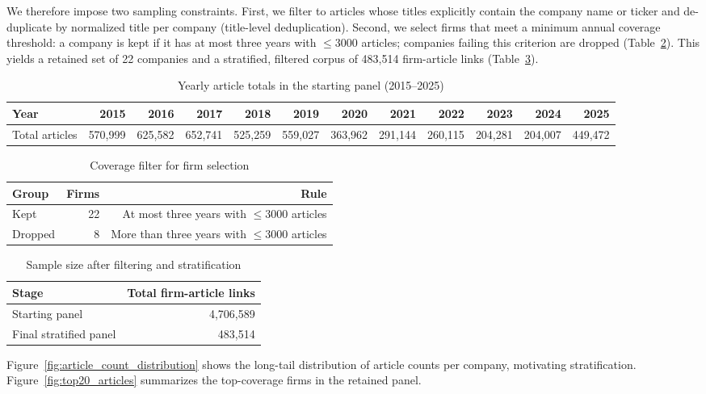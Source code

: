 \documentclass[conference]{IEEEtran}
\begin{document}
We therefore impose two sampling constraints. First, we filter to articles whose titles explicitly contain the company name or ticker and de-duplicate by normalized title per company (title-level deduplication). Second, we select firms that meet a minimum annual coverage threshold: a company is kept if it has at most three years with \(\leq 3000\) articles; companies failing this criterion are dropped (Table~\ref{tab:company_filter}). This yields a retained set of 22 companies and a stratified, filtered corpus of 483,514 firm-article links (Table~\ref{tab:filtered_matrix}).

\begin{table}[htbp]
\caption{Yearly article totals in the starting panel (2015--2025)}
\label{tab:yearly_matrix}
\centering
\begin{tabular}{lrrrrrrrrrrr}
\toprule
Year & 2015 & 2016 & 2017 & 2018 & 2019 & 2020 & 2021 & 2022 & 2023 & 2024 & 2025 \\
\midrule
Total articles & 570,999 & 625,582 & 652,741 & 525,259 & 559,027 & 363,962 & 291,144 & 260,115 & 204,281 & 204,007 & 449,472 \\
\bottomrule
\end{tabular}
\end{table}

\begin{table}[htbp]
\caption{Coverage filter for firm selection}
\label{tab:company_filter}
\centering
\begin{tabular}{lrr}
\toprule
Group & Firms & Rule \\
\midrule
Kept & 22 & At most three years with \(\leq 3000\) articles \\
Dropped & 8 & More than three years with \(\leq 3000\) articles \\
\bottomrule
\end{tabular}
\end{table}

\begin{table}[htbp]
\caption{Sample size after filtering and stratification}
\label{tab:filtered_matrix}
\centering
\begin{tabular}{lr}
\toprule
Stage & Total firm-article links \\
\midrule
Starting panel & 4,706,589 \\
Final stratified panel & 483,514 \\
\bottomrule
\end{tabular}
\end{table}

Figure~\ref{fig:article_count_distribution} shows the long-tail distribution of article counts per company, motivating stratification. Figure~\ref{fig:top20_articles} summarizes the top-coverage firms in the retained panel.
\end{document}
